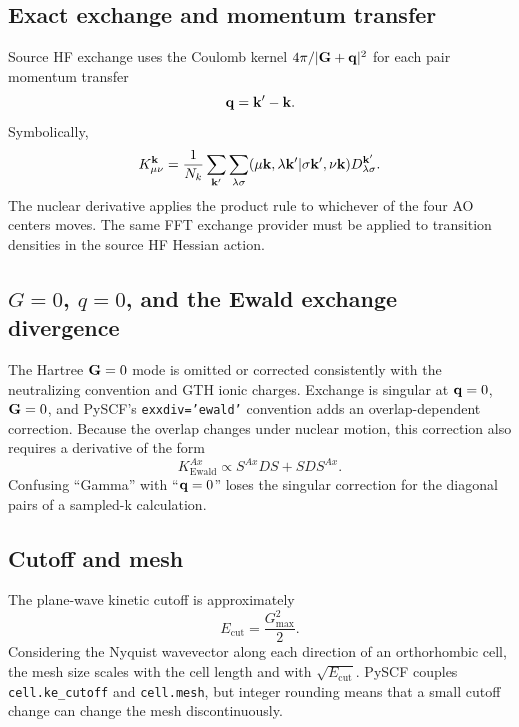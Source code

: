 \subsection{Exact exchange and momentum transfer}

Source HF exchange uses the Coulomb kernel $4\pi/|\mathbf{G}+\mathbf{q}|^2$ for each pair
momentum transfer
\begin{equation}
  \mathbf{q}=\mathbf{k}'-\mathbf{k}.
  \label{eq:fftdf-momentum-transfer}
\end{equation}
Symbolically,
\begin{equation}
  K_{\mu\nu}^{\mathbf{k}}
  =\frac{1}{N_k}\sum_{\mathbf{k}'}\sum_{\lambda\sigma}
   (\mu\mathbf{k},\lambda\mathbf{k}'|\sigma\mathbf{k}',\nu\mathbf{k})
   D_{\lambda\sigma}^{\mathbf{k}'}.
  \label{eq:fftdf-exchange}
\end{equation}
The nuclear derivative applies the product rule to whichever of the four AO
centers moves.  The same FFT exchange provider must be applied to transition
densities in the source HF Hessian action.

\subsection{\texorpdfstring{$G=0$, $q=0$}{G=0, q=0}, and the Ewald exchange divergence}

The Hartree $\mathbf{G}=0$ mode is omitted or corrected consistently with the
neutralizing convention and GTH ionic charges.  Exchange is singular at
$\mathbf{q}=0$, $\mathbf{G}=0$, and PySCF's \texttt{exxdiv='ewald'} convention adds an
overlap-dependent correction.  Because the overlap changes under nuclear
motion, this correction also requires a derivative of the form
\begin{equation}
  K_{\mathrm{Ewald}}^{Ax}
  \propto S^{Ax}DS+SDS^{Ax}.
  \label{eq:fftdf-ewald-exchange-derivative}
\end{equation}
Confusing ``Gamma'' with ``$\mathbf{q}=0$'' loses the singular correction for the
diagonal pairs of a sampled-k calculation.

\subsection{Cutoff and mesh}

The plane-wave kinetic cutoff is approximately
\begin{equation}
  E_{\mathrm{cut}}=\frac{G_{\max}^2}{2}.
  \label{eq:cutoff-definition}
\end{equation}
Considering the Nyquist wavevector along each direction of an orthorhombic
cell, the mesh size scales with the cell length and with
$\sqrt{E_{\mathrm{cut}}}$.  PySCF couples \texttt{cell.ke\_cutoff} and
\texttt{cell.mesh}, but integer rounding means that a small cutoff change can
change the mesh discontinuously.

